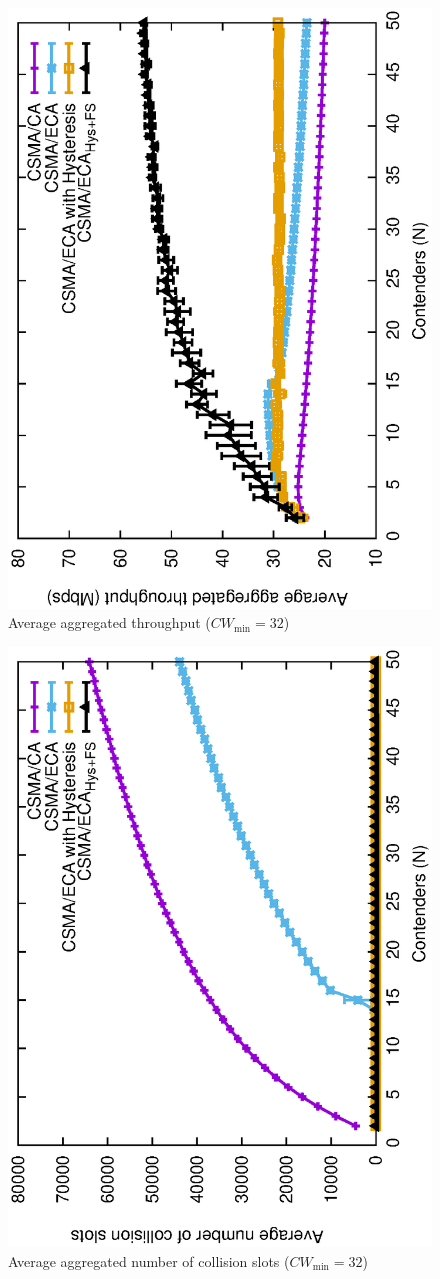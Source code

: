 	\begin{figure}[t!]
	\centering
		\includegraphics[width=0.7\linewidth, angle=-90]{figures/throughput-perfectChannel.eps}
		\caption{Average aggregated throughput ($CW_{\min}=32$)\cite{sanabria2014high}}
		\label{fig:CAvsECA}
	\end{figure}
	
	\begin{figure}[t!]
	\centering
		\includegraphics[width=0.7\linewidth, angle=-90]{figures/collisions-perfectChannel.eps}
		\caption{Average aggregated number of collision slots ($CW_{\min}=32$)\cite{sanabria2014high}}
		\label{fig:col-CAvsECA}
	\end{figure}


